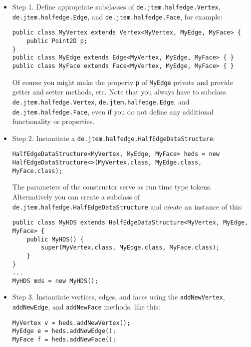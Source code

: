 \documentclass[Thesis.tex]{subfiles}
\begin{document}
\begin{itemize}
\item{Step 1.} 
Define appropriate subclasses of {\tt de.jtem.half\-edge.Vertex}, {\tt de.jtem.half\-edge.Edge}, and 
{\tt de.jtem.halfedge.Face}, for example:

\begin{lstlisting}[numbers=none]
public class MyVertex extends Vertex<MyVertex, MyEdge, MyFace> {
	public Point2D p;
}
public class MyEdge extends Edge<MyVertex, MyEdge, MyFace> { }
public class MyFace extends Face<MyVertex, MyEdge, MyFace> { }
\end{lstlisting}

Of course you might make the property {\tt p} of {\tt MyEdge} private and provide getter and setter 
methods, etc. Note that you always have to subclass {\tt de.jtem.half\-edge.Vertex}, 
{\tt de.jtem.half\-edge.Edge}, and {\tt de.jtem.half\-edge.Face}, even if you do not define any 
additional functionality or properties.

\item{Step 2.} 
Instantiate a {\tt de.jtem.halfedge.HalfEdgeDataStructure}:

\begin{lstlisting}[numbers=none]
HalfEdgeDataStructure<MyVertex, MyEdge, MyFace> heds = new HalfEdgeDataStructure<>(MyVertex.class, MyEdge.class, MyFace.class);
\end{lstlisting}

The parameters of the constructor serve as run time type tokens. Alternatively you can create a subclass
of {\tt de.jtem.halfedge.HalfEdgeDataStructure} and create an instance of this:

\begin{lstlisting}[numbers=none]
public class MyHDS extends HalfEdgeDataStructure<MyVertex, MyEdge, MyFace> {
	public MyHDS() {
		super(MyVertex.class, MyEdge.class, MyFace.class);
	}
}
...
MyHDS mds = new MyHDS();
\end{lstlisting}

\item{Step 3.} 
Instantiate vertices, edges, and faces using the {\tt addNewVertex}, {\tt addNewEdge}, and 
{\tt addNewFace} methods, like this:

\begin{lstlisting}[numbers=none]
MyVertex v = heds.addNewVertex();
MyEdge e = heds.addNewEdge();
MyFace f = heds.addNewFace();
\end{lstlisting}

\end{itemize}
\end{document}
